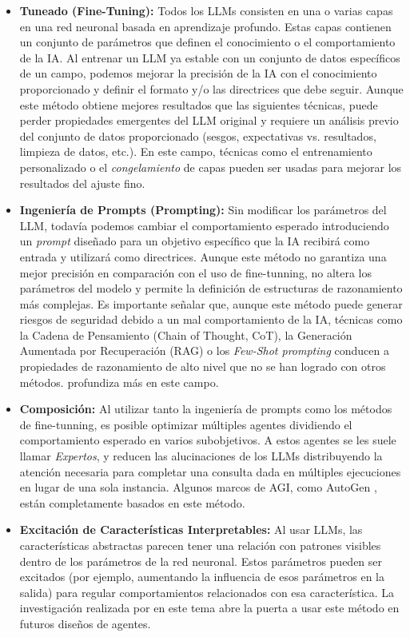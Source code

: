 \begin{itemize} \item \textbf{Tuneado (Fine-Tuning):} Todos los LLMs
    consisten en una o varias capas en una red neuronal basada en aprendizaje
    profundo. Estas capas contienen un conjunto de parámetros que definen el
    conocimiento o el comportamiento de la IA. Al entrenar un LLM ya estable con
    un conjunto de datos específicos de un campo, podemos mejorar la precisión de
    la IA con el conocimiento proporcionado y definir el formato y/o las
    directrices que debe seguir. Aunque este método obtiene mejores resultados
    que las siguientes técnicas, puede perder propiedades emergentes del LLM
    original y requiere un análisis previo del conjunto de datos proporcionado
    (sesgos, expectativas vs. resultados, limpieza de datos, etc.). En este
    campo, técnicas como el entrenamiento personalizado o el
    \textit{congelamiento} de capas pueden ser usadas para mejorar los
    resultados del ajuste fino.

\item \textbf{Ingeniería de Prompts (Prompting):} Sin modificar los parámetros del
    LLM, todavía podemos cambiar el comportamiento esperado introduciendo un
    \textit{prompt} diseñado para un objetivo específico que la IA recibirá como
    entrada y utilizará como directrices. Aunque este método no garantiza una mejor
    precisión en comparación con el uso de fine-tunning, no altera los parámetros del modelo
    y permite la definición de estructuras de razonamiento más complejas. Es importante
    señalar que, aunque este método puede generar riesgos de seguridad debido a un
    mal comportamiento de la IA, técnicas como la Cadena de Pensamiento (Chain of
    Thought, CoT), la Generación Aumentada por Recuperación (RAG) o los
    \textit{Few-Shot prompting} conducen a propiedades de razonamiento de alto nivel
    que no se han logrado con otros métodos. \cite{sahoo2024systematic}
    profundiza más en este campo.

\item \textbf{Composición:} Al utilizar tanto la ingeniería de prompts como los
    métodos de fine-tunning, es posible optimizar múltiples agentes dividiendo el
    comportamiento esperado en varios subobjetivos. A estos agentes se les suele
    llamar \textit{Expertos}, y reducen las alucinaciones de los LLMs distribuyendo
    la atención necesaria para completar una consulta dada en múltiples ejecuciones
    en lugar de una sola instancia. Algunos marcos de AGI, como AutoGen
    \cite{wu2023autogen}, están completamente basados en este método.

\item \textbf{Excitación de Características Interpretables:} Al usar LLMs, las
    características abstractas parecen tener una relación con patrones visibles
    dentro de los parámetros de la red neuronal. Estos parámetros pueden ser
    excitados (por ejemplo, aumentando la influencia de esos parámetros en la
    salida) para regular comportamientos relacionados con esa característica. La
    investigación realizada por \cite{viteri2024scaling} en este tema abre la puerta
    a usar este método en futuros diseños de agentes.  \end{itemize}


